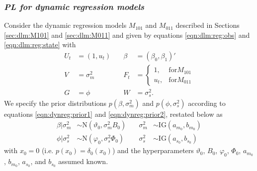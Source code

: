 \subsubsection{\emph{PL for dynamic regression models} \label{sec:pl:dr}}

Consider the dynamic regression models $M_{101}$ and $M_{011}$ described in Sections \ref{sec:dlm:M101} and \ref{sec:dlm:M011} and given by equations \eqref{eqn:dlm:reg:obs} and \eqref{eqn:dlm:reg:state} with
\begin{align*}
U_t &= (1, u_t) &\quad \beta &= (\beta_0, \beta_1)' \\
V &= \sigma^2_m &\quad F_t &= \left\{\begin{array}{ll} 1, & \mbox{for} M_{101} \\ u_t, & \mbox{for} M_{011} \end{array}\right. \\
G &= \phi &\quad W &= \sigma^2_s.
\end{align*}
We specify the prior distributions $p(\beta,\sigma^2_m)$ and $p(\phi,\sigma^2_s)$ according to equations \eqref{eqn:dynreg:prior1} and \eqref{eqn:dynreg:prior2}, restated below as
\begin{align}
\beta|\sigma^2_m &\sim \mbox{N}(\vartheta_0, \sigma^2_m B_0) &\quad \sigma^2_m &\sim \mbox{IG}(a_{m_0},b_{m_0}) \label{eqn:pl:prior:beta} \\
\phi|\sigma^2_s &\sim \mbox{N}(\varphi_0, \sigma^2_s \Phi_0) &\quad \sigma^2_s &\sim \mbox{IG}(a_{s_0},b_{s_0}) \label{eqn:pl:prior:phi}
\end{align}
with $x_0 = 0$ (i.e. $p(x_0) = \delta_0(x_0)$) and the hyperparameters $\vartheta_0$, $B_0$, $\varphi_0$, $\Phi_0$, $a_{m_0}$, $b_{m_0}$, $a_{s_0}$, and $b_{s_0}$ assumed known.

